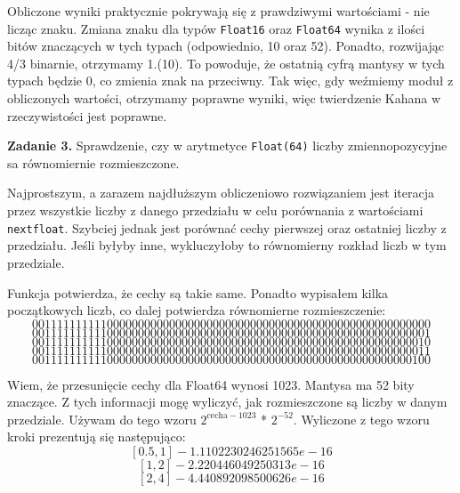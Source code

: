 \documentclass[15pt, a4paper]{article}
\begin{document}

Obliczone wyniki praktycznie pokrywają się z prawdziwymi wartościami - nie licząc znaku. Zmiana znaku dla typów \verb|Float16| oraz \verb|Float64| wynika z ilości bitów znaczących w tych typach (odpowiednio, 10 oraz 52). Ponadto, rozwijając 4/3 binarnie, otrzymamy 1.(10). To powoduje, że ostatnią cyfrą mantysy w tych typach będzie 0, co zmienia znak na przeciwny. Tak więc, gdy weźmiemy moduł z obliczonych wartości, otrzymamy poprawne wyniki, więc twierdzenie Kahana w rzeczywistości jest poprawne.

\vspace{0.5cm}

\noindent\hrulefill


\vspace{0.5cm}

\noindent\textbf{Zadanie 3.} Sprawdzenie, czy w arytmetyce \verb|Float(64)| liczby zmiennopozycyjne sa równomiernie rozmieszczone.

\vspace{0.5cm}


Najprostszym, a zarazem najdłuższym obliczeniowo rozwiązaniem jest iteracja przez wszystkie liczby z danego przedziału w celu porównania z wartościami \verb|nextfloat|. Szybciej jednak jest porównać cechy pierwszej oraz ostatniej liczby z przedziału. Jeśli byłyby inne, wykluczyłoby to równomierny rozkład liczb w tym przedziale.

Funkcja potwierdza, że cechy są takie same. Ponadto wypisałem kilka początkowych liczb, co dalej potwierdza równomierne rozmieszczenie:
\[0011111111110000000000000000000000000000000000000000000000000000\]
\[0011111111110000000000000000000000000000000000000000000000000001\]
\[0011111111110000000000000000000000000000000000000000000000000010\]
\[0011111111110000000000000000000000000000000000000000000000000011\]
\[0011111111110000000000000000000000000000000000000000000000000100\]

\vspace{0.5cm}

Wiem, że przesunięcie cechy dla Float64 wynosi 1023. Mantysa ma 52 bity znaczące. Z tych informacji mogę wyliczyć, jak rozmieszczone są liczby w danym przedziale. Używam do tego wzoru $2^{\mathrm{cecha - 1023}}$ * $2^{\mathrm{-52}}$. Wyliczone z tego wzoru kroki prezentują się następująco:
\[[0.5, 1] - 1.1102230246251565e-16\]
\[[1, 2] - 2.220446049250313e-16\]
\[[2, 4] - 4.440892098500626e-16\]
\end{document}
